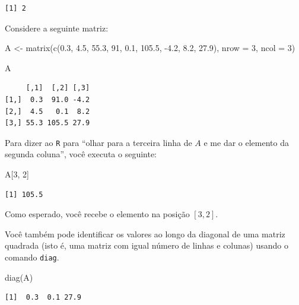 \documentclass[
  letterpaper,
  DIV=11,
  numbers=noendperiod]{scrreprt}
\newenvironment{Shaded}{\begin{snugshade}}{\end{snugshade}}
\newcommand{\AttributeTok}[1]{\textcolor[rgb]{0.40,0.45,0.13}{#1}}
\newcommand{\DecValTok}[1]{\textcolor[rgb]{0.68,0.00,0.00}{#1}}
\newcommand{\FloatTok}[1]{\textcolor[rgb]{0.68,0.00,0.00}{#1}}
\newcommand{\FunctionTok}[1]{\textcolor[rgb]{0.28,0.35,0.67}{#1}}
\newcommand{\NormalTok}[1]{\textcolor[rgb]{0.00,0.23,0.31}{#1}}
\newcommand{\OtherTok}[1]{\textcolor[rgb]{0.00,0.23,0.31}{#1}}
\newcommand{\SpecialCharTok}[1]{\textcolor[rgb]{0.37,0.37,0.37}{#1}}
\begin{document}
\begin{verbatim}
[1] 2
\end{verbatim}

Considere a seguinte matriz:

\begin{Shaded}
\begin{Highlighting}[]
\NormalTok{A }\OtherTok{\textless{}{-}} \FunctionTok{matrix}\NormalTok{(}\FunctionTok{c}\NormalTok{(}\FloatTok{0.3}\NormalTok{, }\FloatTok{4.5}\NormalTok{, }\FloatTok{55.3}\NormalTok{, }\DecValTok{91}\NormalTok{, }\FloatTok{0.1}\NormalTok{, }\FloatTok{105.5}\NormalTok{, }\SpecialCharTok{{-}}\FloatTok{4.2}\NormalTok{, }\FloatTok{8.2}\NormalTok{, }\FloatTok{27.9}\NormalTok{), }\AttributeTok{nrow =} \DecValTok{3}\NormalTok{, }\AttributeTok{ncol =} \DecValTok{3}\NormalTok{)}

\NormalTok{A}
\end{Highlighting}
\end{Shaded}

\begin{verbatim}
     [,1]  [,2] [,3]
[1,]  0.3  91.0 -4.2
[2,]  4.5   0.1  8.2
[3,] 55.3 105.5 27.9
\end{verbatim}

Para dizer ao \texttt{R} para ``olhar para a terceira linha de \(A\) e
me dar o elemento da segunda coluna'', você executa o seguinte:

\begin{Shaded}
\begin{Highlighting}[]
\NormalTok{A[}\DecValTok{3}\NormalTok{, }\DecValTok{2}\NormalTok{]}
\end{Highlighting}
\end{Shaded}

\begin{verbatim}
[1] 105.5
\end{verbatim}

Como esperado, você recebe o elemento na posição \([3,2]\).

Você também pode identificar os valores ao longo da diagonal de uma
matriz quadrada (isto é, uma matriz com igual número de linhas e
colunas) usando o comando \texttt{diag}.

\begin{Shaded}
\begin{Highlighting}[]
\FunctionTok{diag}\NormalTok{(A)}
\end{Highlighting}
\end{Shaded}

\begin{verbatim}
[1]  0.3  0.1 27.9
\end{verbatim}
\end{document}
